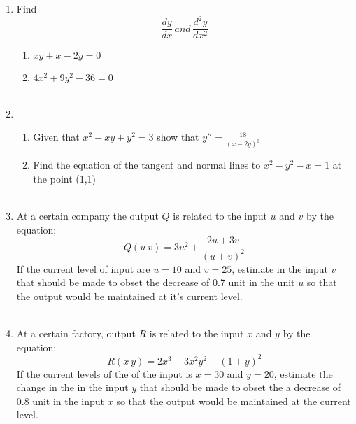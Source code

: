 \documentclass{article}
\begin{document}
\begin {enumerate}


	\item Find \[ \frac{dy}{dx} \, and \, \frac{d^2y}{dx^2} \tag {Express your answer in terms of $x$ and $y$}\] 
		\begin {enumerate}
			\item $xy+x-2y=0$
			\item $4x^2+9y^2-36=0$ \\ \

		\end {enumerate}


	\item \

		\begin{enumerate}
			\item Given that $x^2-xy+y^2=3$ show that $y''=\frac{18}{(x-2y)^3}$
			\item Find the equation of the tangent and normal lines to $x^2-y^2-x=1$ at the point (1,1) \\ \

		\end {enumerate}


	\item At a certain company the output $Q$ is related to the input $u$ and $v$ by the equation;
 $$Q(u\  v)=3u^2+\frac{2u+3v}{(u+v)^2}$$
If the current level of input are $u=10$ and $v=25$, estimate in the input $v$ that should be made to obset the decrease of 0.7 unit in the unit $u$ so that the output would be maintained at it's current level. \\ \


	\item At a certain factory, output $R$ is related to the input $x$ and $y$ by the equation;
$$R(x\  y)=2x^3+3x^2y^2+(1+y)^2$$
If the current levels of the of the input is $x=30$ and $y=20$, estimate the change in the in the input $y$ that should be made to obset the a decrease of 0.8 unit in the input $x$ so that the output would be maintained at the current level. 

\end {enumerate}
\end{document}
